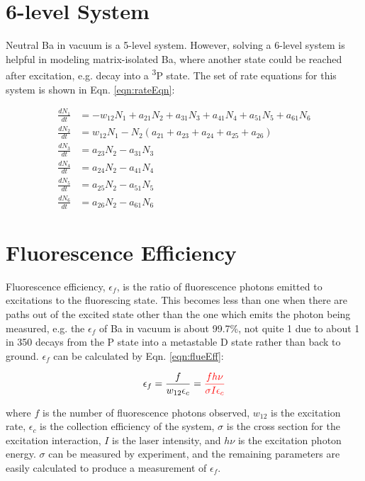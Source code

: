 
\section{6-level System}

Neutral Ba in vacuum is a 5-level system.  However, solving a 6-level system is helpful in modeling matrix-isolated Ba, where another state could be reached after excitation, e.g. decay into a \textsuperscript{3}P state.  The set of rate equations for this system is shown in Eqn. \ref{eqn:rateEqn}:

\begin{equation}
\begin{aligned}
\frac{dN_1}{dt} &= - w_{12}N_{1} + a_{21}N_{2} + a_{31}N_{3} + a_{41}N_{4} + a_{51} N_{5} + a_{61}N_{6} \\
\frac{dN_2}{dt} &= w_{12}N_{1} - N_{2}(a_{21} + a_{23} + a_{24} + a_{25} + a_{26}) \\
\frac{dN_3}{dt} &= a_{23}N_{2} - a_{31}N_{3} \\
\frac{dN_4}{dt} &= a_{24}N_{2} - a_{41}N_{4} \\
\frac{dN_5}{dt} &= a_{25}N_{2} - a_{51}N_{5} \\
\frac{dN_6}{dt} &= a_{26}N_{2} - a_{61}N_{6}
\end{aligned}
\label{eqn:rateEqn}
\end{equation}

\section{Fluorescence Efficiency}

Fluorescence efficiency, $\epsilon_{f}$, is the ratio of fluorescence photons emitted to excitations to the fluorescing state.  This becomes less than one when there are paths out of the excited state other than the one which emits the photon being measured, e.g. the $\epsilon_{f}$ of Ba in vacuum is about 99.7\%, not quite 1 due to about 1 in 350 decays from the P state into a metastable D state rather than back to ground.  $\epsilon_{f}$ can be calculated by Eqn. \ref{eqn:flueEff}:

\begin{equation}
\epsilon_{f} = \frac{f}{w_{12} \epsilon_{c}} = {\color{red}\frac{f h \nu}{\sigma I \epsilon_{c}}}
\label{eqn:flueEff}
\end{equation}

\noindent
where $f$ is the number of fluorescence photons observed, $w_{12}$ is the excitation rate, $\epsilon_{c}$ is the collection efficiency of the system, $\sigma$ is the cross section for the excitation interaction, $I$ is the laser intensity, and $h \nu$ is the excitation photon energy.  $\sigma$ can be measured by experiment, and the remaining parameters are easily calculated to produce a measurement of $\epsilon_{f}$.